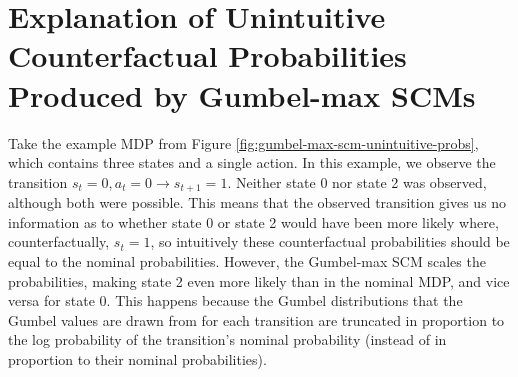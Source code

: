 %
%

\section{Explanation of Unintuitive Counterfactual Probabilities Produced by Gumbel-max SCMs}
\label{app: unintuitive probs explanation}

Take the example MDP from Figure \ref{fig:gumbel-max-scm-unintuitive-probs}, which contains three states and a single action. In this example, we observe the transition $s_t=0, a_t=0 \rightarrow s_{t+1}=1$. Neither state 0 nor state 2 was observed, although both were possible. This means that the observed transition gives us no information as to whether state 0 or state 2 would have been more likely where, counterfactually, $s_t = 1$, so intuitively these counterfactual probabilities should be equal to the nominal probabilities. However, the Gumbel-max SCM scales the probabilities, making state 2 even more likely than in the nominal MDP, and vice versa for state 0. This happens because the Gumbel distributions that the Gumbel values are drawn from for each transition are truncated in proportion to the log probability of the transition's nominal probability (instead of in proportion to their nominal probabilities).

